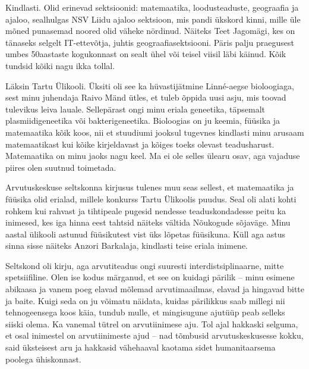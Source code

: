 Kindlasti. Olid erinevad sektsioonid: matemaatika, loodusteaduste, 
geograafia ja ajaloo, sealhulgas NSV Liidu ajaloo sektsioon, mis 
pandi ükskord kinni, mille üle mõned punasemad noored olid väheke nördinud. Näiteks Teet 
Jagomägi, kes on tänaseks selgelt IT-ettevõtja, juhtis 
geograafiasektsiooni. Päris palju praegusest umbes 50aastaste kogukonnast on sealt ühel või teisel viisil läbi käinud. Kõik 
tundsid kõiki nagu ikka tollal.


Läksin Tartu Ülikooli. Üksiti oli see ka hüvastijätmine 
Linné-aegse bioloogiaga, sest minu juhendaja Raivo Mänd ütles, et tuleb õppida uusi asju, mis toovad tulevikus leiva lauale. Sellepärast ongi minu eriala geneetika, täpsemalt plasmiidigeneetika 
või bakterigeneetika. Bioloogias on ju keemia, füüsika ja matemaatika 
kõik koos, nii et stuudiumi jooksul tugevnes kindlasti minu arusaam 
matemaatikast kui kõike kirjeldavast ja kõiges toeks olevast teadusharust. 
Matemaatika on minu jaoks nagu keel. Ma ei ole selles ülearu osav, aga vajaduse 
piires olen suutnud toimetada.


Arvutuskeskuse seltskonna kirjusus tulenes muu seas sellest, et matemaatika 
ja füüsika olid erialad, millele konkurss Tartu Ülikoolis puudus. Seal oli 
alati kohti rohkem kui rahvast ja tihtipeale pugesid nendesse teaduskondadesse 
peitu ka inimesed, kes iga hinna eest tahtsid näiteks vältida Nõukogude 
sõjaväge. Minu aastal ülikooli astunud füüsikutest vist üks lõpetas füüsikuna. 
Küll aga astus sinna sisse näiteks Anzori 
Barkalaja, kindlasti teise eriala inimene. 

Seltskond oli kirju, aga arvutiteadus ongi suuresti 
interdistsiplinaarne, mitte spetsiifiline. Olen 
ise kodus märganud, et see on kuidagi pärilik -- minu esimene abikaasa 
ja vanem poeg elavad mõlemad arvutimaailmas, elavad ja hingavad 
bitte ja baite. Kuigi seda on ju võimatu näidata, kuidas pärilikkus saab 
millegi nii tehnogeensega koos käia, tundub mulle, et mingisugune ajutüüp 
peab selleks siiski olema. Ka vanemal tütrel on arvutiinimese aju. 
Tol ajal hakkaski selguma, et osal inimestel on 
arvutiinimeste ajud -- nad tõmbusid arvutuskeskusesse kokku, said 
üksteisest aru ja hakkasid vähehaaval kaotama sidet humanitaarsema poolega 
ühiskonnast.

